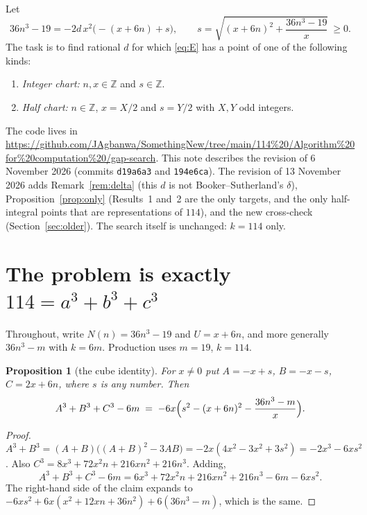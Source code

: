\documentclass[11pt,a4paper]{article}
\newtheorem{proposition}{Proposition}
\theoremstyle{remark}
\newcommand{\code}[1]{\path{#1}}
\begin{document}
Let
\begin{equation}\label{eq:E}\tag{E}
  36n^3-19=-2d\,x^2\bigl(-(x+6n)+s\bigr),\qquad
  s=\sqrt{(x+6n)^2+\frac{36n^3-19}{x}}\ \ge 0 .
\end{equation}
The task is to find rational $d$ for which \eqref{eq:E} has a point of one of the following
kinds:
\begin{enumerate}[label=\textbf{Result \arabic*.},leftmargin=*]
  \item \emph{Integer chart:} $n,x\in\mathbb Z$ and $s\in\mathbb Z$.
  \item \emph{Half chart:} $n\in\mathbb Z$, $x=X/2$ and $s=Y/2$ with $X,Y$ odd integers.
\end{enumerate}
The code lives in
\url{https://github.com/JAgbanwa/SomethingNew/tree/main/114%20/Algorithm%20for%20computation%20/gap-search}.
This note describes the revision of 6 November 2026 (commits \texttt{d19a6a3} and
\texttt{194e6ca}). The revision of 13 November 2026 adds Remark~\ref{rem:delta} (this $d$ is
not Booker--Sutherland's $\delta$), Proposition~\ref{prop:only} (Results~1 and~2 are the only
targets, and the only half-integral points that are representations of $114$), and the new
cross-check \code{rational-d-search/} (Section~\ref{sec:older}). The search itself is
unchanged: $k=114$ only.

\section{The problem is exactly \texorpdfstring{$114=a^3+b^3+c^3$}{114 = a3 + b3 + c3}}\label{sec:reduction}

Throughout, write $N(n)=36n^3-19$ and $U=x+6n$, and more generally $36n^3-m$ with $k=6m$.
Production uses $m=19$, $k=114$.

\begin{proposition}[the cube identity]\label{prop:identity}
For $x\ne0$ put $A=-x+s$, $B=-x-s$, $C=2x+6n$, where $s$ is any number. Then
\[
  A^3+B^3+C^3-6m \;=\; -6x\Bigl(s^2-(x+6n)^2-\frac{36n^3-m}{x}\Bigr).
\]
\end{proposition}
\begin{proof}
$A^3+B^3=(A+B)\bigl((A+B)^2-3AB\bigr)=-2x(4x^2-3x^2+3s^2)=-2x^3-6xs^2$.
Also $C^3=8x^3+72x^2n+216xn^2+216n^3$. Adding,
\[
A^3+B^3+C^3-6m=6x^3+72x^2n+216xn^2+216n^3-6m-6xs^2 .
\]
The right-hand side of the claim expands to
$-6xs^2+6x(x^2+12xn+36n^2)+6(36n^3-m)$, which is the same.
\end{proof}
\end{document}
